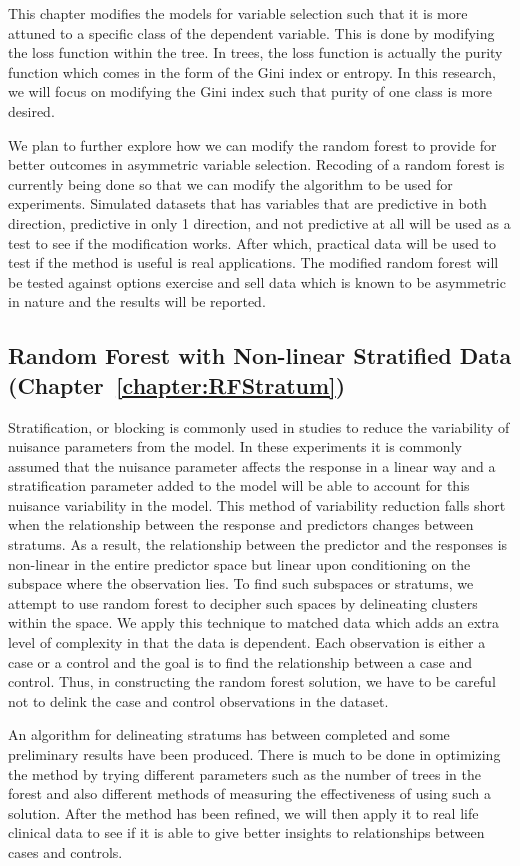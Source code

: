 This chapter modifies the models for variable selection such that it is more attuned to a specific class of the dependent variable. This is done by modifying the loss function within the tree. In trees, the loss function is actually the purity function which comes in the form of the Gini index or entropy. In this research, we will focus on modifying the Gini index such that purity of one class is more desired.

We plan to further explore how we can modify the random forest to provide for better outcomes in asymmetric variable selection. Recoding of a random forest is currently being done so that we can modify the algorithm to be used for experiments. Simulated datasets that has variables that are predictive in both direction, predictive in only 1 direction, and not predictive at all will be used as a test to see if the modification works. After which, practical data will be used to test if the method is useful is real applications. The modified random forest will be tested against options exercise and sell data which is known to be asymmetric in nature and the results will be reported. 

\subsection{Random Forest with Non-linear Stratified Data (Chapter~\ref{chapter:RFStratum})}
Stratification, or blocking is commonly used in studies to reduce the variability of nuisance parameters from the model. In these experiments it is commonly assumed that the nuisance parameter affects the response in a linear way and a stratification parameter added to the model will be able to account for this nuisance variability in the model. This method of variability reduction falls short when the relationship between the response and predictors changes between stratums. As a result, the relationship between the predictor and the responses is non-linear in the entire predictor space but linear upon conditioning on the subspace where the observation lies. To find such subspaces or stratums, we attempt to use random forest to decipher such spaces by delineating clusters within the space. We apply this technique to matched data which adds an extra level of complexity in that the data is dependent. Each observation is either a case or a control and the goal is to find the relationship between a case and control. Thus, in constructing the random forest solution, we have to be careful not to delink the case and control observations in the dataset. 

An algorithm for delineating stratums has between completed and some preliminary results have been produced. There is much to be done in optimizing the method by trying different parameters such as the number of trees in the forest and also different methods of measuring the effectiveness of using such a solution. After the method has been refined, we will then apply it to real life clinical data to see if it is able to give better insights to relationships between cases and controls. 

 